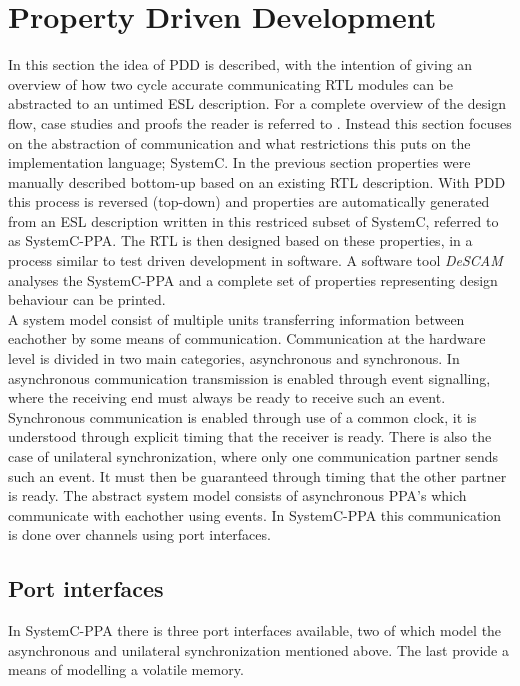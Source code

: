 \section{Property Driven Development}
\label{sec:pdd}
In this section the idea of PDD is described, with the intention of giving an overview of how two cycle accurate communicating RTL modules can be abstracted to an untimed ESL description. For a complete overview of the design flow, case studies and proofs the reader is referred to \cite{pddref}. Instead this section focuses on the abstraction of communication and what restrictions this puts on the implementation language; SystemC. In the previous section properties were manually described bottom-up based on an existing RTL description. With PDD this process is reversed (top-down) and properties are automatically generated from an ESL description written in this restriced subset of SystemC, referred to as SystemC-PPA. The RTL is then designed based on these properties, in a process similar to test driven development in software. A software tool \textit{DeSCAM} \cite{descam} analyses the SystemC-PPA and a complete set of properties representing design behaviour can be printed.\\
\newline
A system model consist of multiple units transferring information between eachother by some means of communication. Communication at the hardware level is divided in two main categories, asynchronous and synchronous. In asynchronous communication transmission is enabled through event signalling, where the receiving end must always be ready to receive such an event. Synchronous communication is enabled through use of a common clock, it is understood through explicit timing that the receiver is ready. There is also the case of unilateral synchronization, where only one communication partner sends such an event. It must then be guaranteed through timing that the other partner is ready. The abstract system model consists of asynchronous PPA's which communicate with eachother using events. In SystemC-PPA this communication is done over channels using port interfaces. 

\subsection{Port interfaces}
\label{subsec:ports}       
In SystemC-PPA there is three port interfaces available, two of which model the asynchronous and unilateral synchronization mentioned above. The last provide a means of modelling a volatile memory. 

